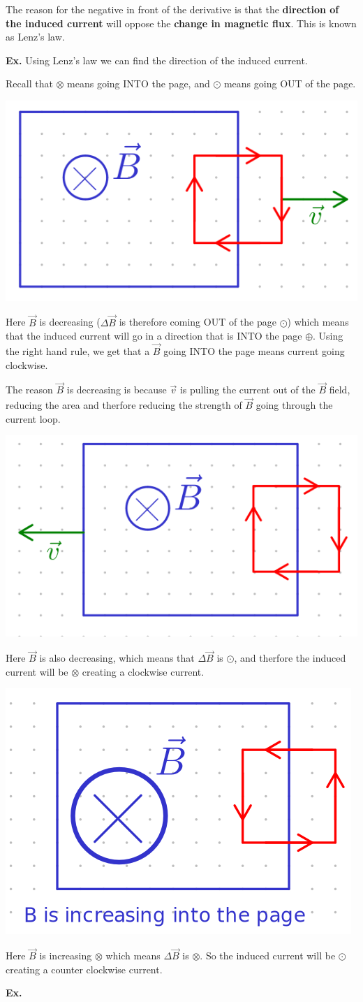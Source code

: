 \documentclass[12pt,letterpaper]{article} \usepackage{amsmath} \usepackage{graphicx} \usepackage[margin=1in]{geometry} \usepackage{longtable}  \usepackage{amssymb}
\begin{document}
	The reason for the negative in front of the derivative is that the \textbf{direction of the induced current} will oppose the \textbf{change in magnetic flux}. This is known as Lenz's law.
	
	\begin{mdframed}
		\textbf{Ex. } Using Lenz's law we can find the direction of the induced current.
		
		Recall that $\otimes$ means going INTO the page, and $\odot$ means going OUT of the page.
		
		\begin{center}
			\includegraphics[width=0.3\linewidth]{lenz1}
		\end{center}
		Here $\vec B$ is decreasing ($\Delta \vec B$ is therefore coming OUT of the page $\odot$) which means that the induced current will go in a direction that is INTO the page $\oplus$. Using the right hand rule, we get that a $\vec B$ going INTO the page means current going clockwise.
		
		The reason $\vec B$ is decreasing is because $\vec v$ is pulling the current out of the $\vec B$ field, reducing the area and therfore reducing the strength of $\vec B$ going through the current loop.
		
		\begin{center}
			\includegraphics[width=0.3\linewidth]{lenz2}
		\end{center}
		Here $\vec B$ is also decreasing, which means that $\Delta \vec B$ is $\odot$, and therfore the induced current will be $\otimes$ creating a clockwise current.
		
		\begin{center}
			\includegraphics[width=0.3\linewidth]{lenz3}
		\end{center}
		Here $\vec B$ is increasing $\otimes$ which means $\Delta \vec B$ is $\otimes$. So the induced current will be $\odot$ creating a counter clockwise current.
		
	\end{mdframed}

	\begin{mdframed}
		\textbf{Ex. }
	\end{mdframed}
	
	
\end{document}
